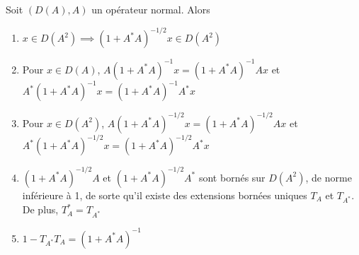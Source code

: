 \begin{The}
Soit $(D(A),A)$ un opérateur normal. Alors
\begin{enumerate}
\item $x\in D(A^2)\implies (1+A^*A)^{-1/2}x\in D(A^2)$
\item Pour $x\in D(A)$, $A(1+A^*A)^{-1}x=(1+A^*A)^{-1}Ax$ et $A^*(1+A^*A)^{-1}x=(1+A^*A)^{-1}A^*x$
\item Pour $x\in D(A^2)$, $A(1+A^*A)^{-1/2}x=(1+A^*A)^{-1/2}Ax$ et $A^*(1+A^*A)^{-1/2}x=(1+A^*A)^{-1/2}A^*x$
\item $(1+A^*A)^{-1/2}A$ et $(1+A^*A)^{-1/2}A^*$ sont bornés sur $D(A^2)$, de norme inférieure à 1, de sorte qu'il existe des extensions bornées uniques $T_A$ et $T_{A^*}$. De plus, $T_A^*=T_{A^*}$
\item $1-T_{A^*}T_A=(1+A^*A)^{-1}$
\end{enumerate}
\label{avantder}\end{The}

